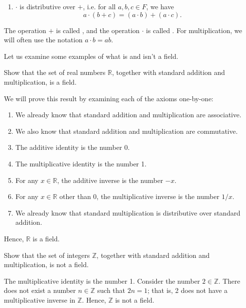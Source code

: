 \begin{defn}
\begin{enumerate}
    \item $ \cdot $ is distributive over $ + $, i.e. for all $ a,b,c\in F $, we have
    \begin{equation*}
        a\cdot(b+c)=(a\cdot b)+(a\cdot c).
    \end{equation*}
\end{enumerate}

The operation $ + $ is called , and the operation $ \cdot $ is called . For multiplication, we will often use the notation $ a\cdot b=ab $.
\end{defn}

Let us examine some examples of what is and isn't a field.

\begin{exmp}
Show that the set of real numbers $ \mathbb{R} $, together with standard addition and multiplication, is a field.
\end{exmp}
\begin{sltn}
We will prove this result by examining each of the axioms one-by-one:
\begin{enumerate}
    \item We already know that standard addition and multiplication are associative.

    \item We also know that standard addition and multiplication are commutative.

    \item The additive identity is the number 0.
    
    \item The multiplicative identity is the number 1.
    
    \item For any $ x\in\mathbb{R} $, the additive inverse is the number $ -x $.
    
    \item For any $ x\in\mathbb{R} $ other than 0, the multiplicative inverse is the number $ 1/x $.
    
    \item We already know that standard multiplication is distributive over standard addition.
\end{enumerate}
Hence, $ \mathbb{R} $ is a field.
\end{sltn}

\begin{exmp}
Show that the set of integers $ \mathbb{Z} $, together with standard addition and multiplication, is not a field.
\end{exmp}
\begin{sltn}
The multiplicative identity is the number 1. Consider the number $ 2\in\mathbb{Z} $. There does not exist a number $ n\in\mathbb{Z} $ such that $ 2n=1 $; that is, 2 does not have a multiplicative inverse in $ \mathbb{Z} $. Hence, $ \mathbb{Z} $ is not a field.
\end{sltn}

